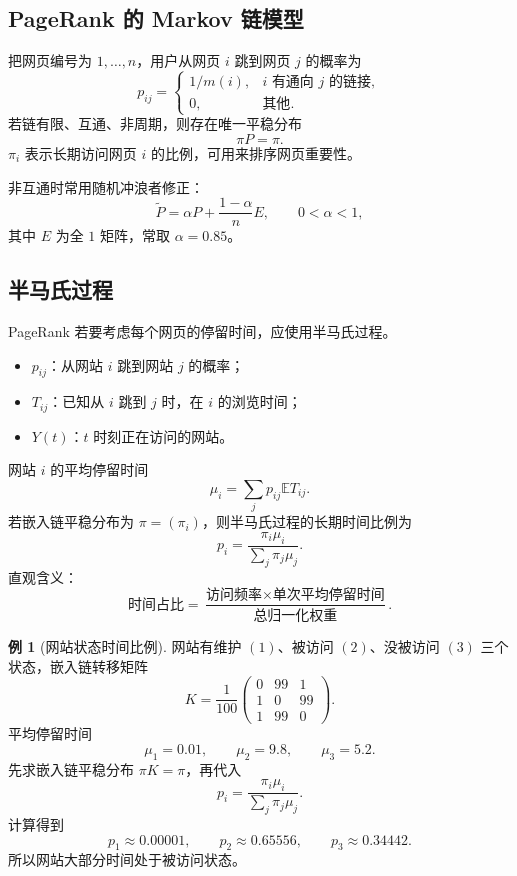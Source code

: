\documentclass[12pt,a4paper,openany]{ctexrep}
\theoremstyle{definition}
\newtheorem{example}{例}[section]
\newcommand{\E}{\mathbb{E}}
\begin{document}
\subsection{PageRank 的 Markov 链模型}

把网页编号为 $1,\dots,n$，用户从网页 $i$ 跳到网页 $j$ 的概率为
\[
p_{ij}=
\begin{cases}
1/m(i),&i\text{ 有通向 }j\text{ 的链接},\\
0,&\text{其他}.
\end{cases}
\]
若链有限、互通、非周期，则存在唯一平稳分布
\[
\pi P=\pi.
\]
$\pi_i$ 表示长期访问网页 $i$ 的比例，可用来排序网页重要性。

非互通时常用随机冲浪者修正：
\[
\widetilde P=\alpha P+\frac{1-\alpha}{n}E,\qquad 0<\alpha<1,
\]
其中 $E$ 为全 $1$ 矩阵，常取 $\alpha=0.85$。

\subsection{半马氏过程}

PageRank 若要考虑每个网页的停留时间，应使用半马氏过程。
\begin{itemize}
	\item $p_{ij}$：从网站 $i$ 跳到网站 $j$ 的概率；
	\item $T_{ij}$：已知从 $i$ 跳到 $j$ 时，在 $i$ 的浏览时间；
	\item $Y(t)$：$t$ 时刻正在访问的网站。
\end{itemize}

网站 $i$ 的平均停留时间
\[
\mu_i=\sum_j p_{ij}\E T_{ij}.
\]
若嵌入链平稳分布为 $\pi=(\pi_i)$，则半马氏过程的长期时间比例为
\[
p_i=\frac{\pi_i\mu_i}{\sum_j\pi_j\mu_j}.
\]
直观含义：
\[
\text{时间占比}=\frac{\text{访问频率}\times\text{单次平均停留时间}}{\text{总归一化权重}}.
\]

\begin{example}[网站状态时间比例]
网站有维护 $(1)$、被访问 $(2)$、没被访问 $(3)$ 三个状态，嵌入链转移矩阵
\[
K=\frac1{100}
\begin{pmatrix}
0&99&1\\
1&0&99\\
1&99&0
\end{pmatrix}.
\]
平均停留时间
\[
\mu_1=0.01,\qquad \mu_2=9.8,\qquad \mu_3=5.2.
\]
先求嵌入链平稳分布 $\pi K=\pi$，再代入
\[
p_i=\frac{\pi_i\mu_i}{\sum_j\pi_j\mu_j}.
\]
计算得到
\[
p_1\approx0.00001,\qquad
p_2\approx0.65556,\qquad
p_3\approx0.34442.
\]
所以网站大部分时间处于被访问状态。
\end{example}
\end{document}
